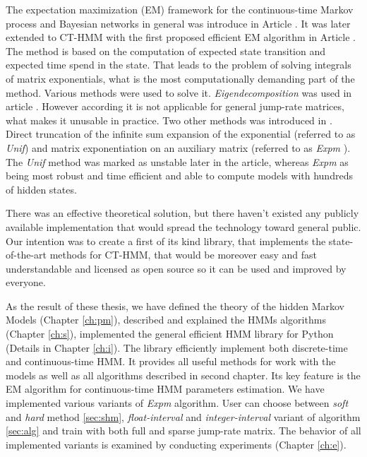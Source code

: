 \documentclass[thesis=M,english]{FITthesis}[2012/10/20]
\begin{document}
\begin{introduction}
The expectation maximization (EM) framework for the continuous-time Markov process and Bayesian networks in general was introduce in Article \cite{No12}. It was later extended to CT-HMM with the first proposed efficient EM algorithm in Article \cite{Li15}. The method is based on the computation of expected state transition and expected time spend in the state. That leads to the problem of solving integrals of matrix exponentials, what is the most computationally demanding part of the method. Various methods were used to solve it. \textit{Eigendecomposition} was used in article \cite{Wa14}. However according \cite{Li15} it is not applicable for general jump-rate matrices, what makes it unusable in practice. Two other methods was introduced in \cite{Li15}. Direct truncation of the infinite sum expansion of the exponential (referred to as \textit{Unif}) and matrix exponentiation on an auxiliary matrix (referred to as \textit{Expm} ). The \textit{Unif} method was marked as unstable later in the article, whereas \textit{Expm} as being most robust and time efficient and able to compute models with hundreds of hidden states.      

There was an effective theoretical solution, but there haven't existed any publicly available implementation that would spread the technology toward general public. Our intention was to create a first of its kind library, that implements the state-of-the-art methods for CT-HMM, that would be moreover easy and fast understandable and licensed as open source so it can be used and improved by everyone. 

As the result of these thesis, we have defined the theory of the hidden Markov Models (Chapter  \ref{ch:pm}), described and explained the HMMs algorithms (Chapter \ref{ch:s}), implemented the general efficient HMM library for Python (Details in Chapter \ref{ch:i}). The library efficiently implement both discrete-time and continuous-time HMM. It provides all useful methods for work with the models as well as all algorithms described in second chapter. Its key feature is the EM algorithm for continuous-time HMM parameters estimation. We have implemented various variants of \textit{Expm} algorithm. User can choose between \textit{soft} and \textit{hard} method \ref{sec:shm}, \textit{float-interval} and \textit{integer-interval} variant of algorithm \ref{sec:alg} and train with both full and sparse jump-rate matrix. The behavior of all implemented variants is examined by conducting  experiments (Chapter \ref{ch:e}).      
 	
\end{introduction}
\end{document}
